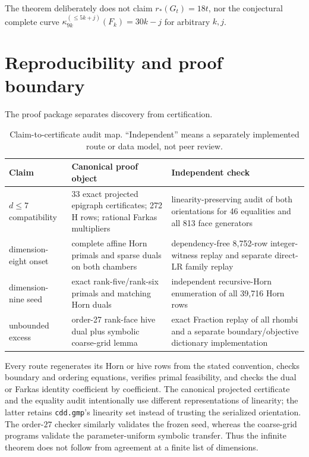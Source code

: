 \documentclass[11pt]{article}
\begin{document}
The theorem deliberately does not claim $r_*(G_t)=18t$, nor the conjectural
complete curve $\kappa_{9k}^{(\le5k+j)}(F_k)=30k-j$ for arbitrary $k,j$.

\section{Reproducibility and proof boundary}\label{sec:repro}

The proof package separates discovery from certification.

\begin{table}[t]
\centering
\caption{Claim-to-certificate audit map.  ``Independent'' means a separately
implemented route or data model, not peer review.}
\label{tab:audit-map}
\scriptsize
\begin{tabular}{@{}p{.20\linewidth}p{.35\linewidth}p{.35\linewidth}@{}}
\toprule
Claim & Canonical proof object & Independent check \\
\midrule
$d\le7$ compatibility & 33 exact projected epigraph certificates; 272 H rows; rational Farkas multipliers & linearity-preserving audit of both orientations for 46 equalities and all 813 face generators \\
dimension-eight onset & complete affine Horn primals and sparse duals on both chambers & dependency-free 8,752-row integer-witness replay and separate direct-LR family replay \\
dimension-nine seed & exact rank-five/rank-six primals and matching Horn duals & independent recursive-Horn enumeration of all 39,716 Horn rows \\
unbounded excess & order-27 rank-face hive dual plus symbolic coarse-grid lemma & exact Fraction replay of all rhombi and a separate boundary/objective dictionary implementation \\
\bottomrule
\end{tabular}
\end{table}

Every route regenerates its Horn or hive rows from the stated convention,
checks boundary and ordering equations, verifies primal feasibility, and
checks the dual or Farkas identity coefficient by coefficient.  The
canonical projected certificate and the equality audit intentionally use
different representations of linearity; the latter retains
\texttt{cdd.gmp}'s linearity set instead of trusting the serialized
orientation.  The order-$27$ checker similarly validates the frozen seed,
whereas the coarse-grid programs validate the parameter-uniform symbolic
transfer.  Thus the infinite theorem does not follow from agreement at a
finite list of dimensions.
\end{document}
